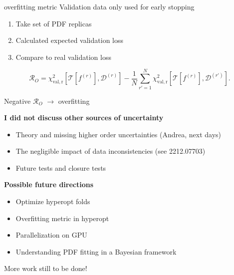 \begin{frame}[t]{overfitting metric}
  Validation data only used for early stopping
  \begin{enumerate}
    \item Take set of PDF replicas
    \item Calculated expected validation loss
    \item Compare to real validation loss
  \end{enumerate}
  $$
  \mathcal{R}_O=\chi_\mathrm{val,r}^2\left[\mathcal{T}\left[f^{(r)}\right], \mathcal{D}^{(r)}\right] -  \frac{1}{N}\sum_{r'=1}^{N}\chi_\mathrm{val,r}^2\left[\mathcal{T}\left[f^{(r)}\right], \mathcal{D}^{(r')}\right].
  $$

  Negative $\mathcal{R}_O$ $\to$ overfitting

\end{frame}


\begin{frame}[t]{}

  {\bf I did not discuss other sources of uncertainty}
  \begin{itemize}
    \item Theory and missing higher order uncertainties (Andrea, next days)
    \item The negligible impact of data inconsistencies (see 2212.07703)
    \item Future tests and closure tests
  \end{itemize}
  \vspace*{0.3cm}
  {\bf Possible future directions}
  \begin{itemize}
    \item Optimize hyperopt folds
    \item Overfitting metric in hyperopt
    \item Parallelization on GPU
    \item Understanding PDF fitting in a Bayesian framework
  \end{itemize}
  More work still to be done!
  \vspace*{2em}
\end{frame}


